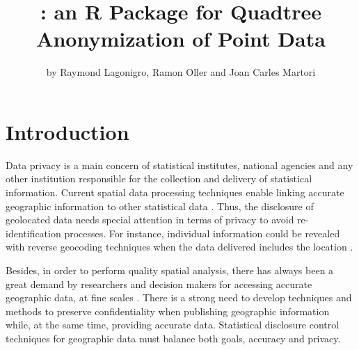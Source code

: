 \title{: an R Package for Quadtree Anonymization of Point Data}
\author{by Raymond Lagonigro, Ramon Oller and Joan Carles Martori}

\maketitle




\section{Introduction} \label{sec:intro}

Data privacy is a main concern of statistical institutes, national agencies and any other institution responsible for the collection and delivery of statistical information. Current spatial data processing techniques enable linking accurate geographic information to other statistical data \citep{Armstrong2005}. Thus, the disclosure of geolocated data needs special attention in terms of privacy to avoid re-identification processes. For instance, individual information could be revealed with reverse geocoding techniques when the data delivered includes the location \citep{Curtis2006,Zimmerman2008,Cassa2008}. 

Besides, in order to perform quality spatial analysis, there has always been a great demand by researchers and decision makers for accessing accurate geographic data, at fine scales \citep{Duncan1991, Okeefe2015, Chen2017}. There is a strong need to develop techniques and methods to preserve confidentiality when publishing geographic information while, at the same time, providing accurate data. Statistical disclosure control techniques for geographic data must balance both goals, accuracy and privacy.

